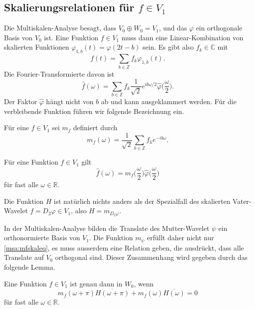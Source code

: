 \subsection{Skalierungsrelationen für $f\in V_1$}
Die Multiskalen-Analyse besagt, dass $V_0 \oplus W_0 = V_1$, und das
$\varphi$ ein orthogonale Basis von $V_0$ ist.
Eine Funktion $f\in V_1$ muss dann eine Linear-Kombination von
skalierten Funktionen $\varphi_{1,b}(t)=\varphi(2t-b)$ sein.
Es gibt also $f_k\in\mathbb C$ mit
\[
f(t) = \sum_{b\in\mathbb Z} f_k \varphi_{1,b}(t).
\]
Die Fourier-Transformierte davon ist
\[
\hat{f}(\omega)
=
\sum_{b\in\mathbb Z}
f_k
\frac{1}{\sqrt{2}}
e^{ib\omega/2}
\hat{\varphi}
\biggl(\frac{\omega}2\biggr).
\]
Der Faktor $\hat{\varphi}$ hängt nicht von $b$ ab und kann ausgeklammert
werden.
Für die verbleibende Funktion führen wir folgende Bezeichnung ein.

\begin{definition}
Für eine $f\in V_1$ sei $m_f$ definiert durch
\[
m_f(\omega)
=
\frac{1}{\sqrt{2}} \sum_{b\in\mathbb Z} f_k e^{-ib\omega}.
\]
\end{definition}

\begin{lemma}
\label{msa:mfskal}
Für eine Funktion $f\in V_1$ gilt
\begin{equation}
\hat{f}(\omega)
=
m_f\biggl(\frac{\omega}2\biggr)
\hat{\varphi}\biggl(\frac{\omega}2\biggr)
\label{msa:mfskaleq}
\end{equation}
für fast alle $\omega\in\mathbb R$.
\end{lemma}

Die Funktion $H$ ist natürlich nichts anders als der Spezialfall
des skalierten Vater-Wavelet $f=D_2\varphi\in V_1$, also $H=m_{D_2\varphi}$.

In der Multiskalen-Analyse bilden die Translate des Mutter-Wavelet $\psi$
ein orthonormierte Basis von $V_1$.
Die Funktion $m_{\psi}$ erfüllt daher nicht nur \eqref{msa:mfskaleq},
es muss ausserdem eine Relation geben, die ausdrückt, dass alle Translate auf
$V_0$ orthogonal sind.
Dieser Zusammenhang wird gegeben durch das folgende Lemma.

\begin{lemma}
Eine Funktion $f\in V_1$ ist genau dann in $W_0$, wenn 
\[
m_f(\omega + \pi)\overline{H(\omega + \pi)}
+
m_f(\omega)\overline{H(\omega)}
=
0
\]
für fast alle $\omega\in\mathbb R$.
\end{lemma}


